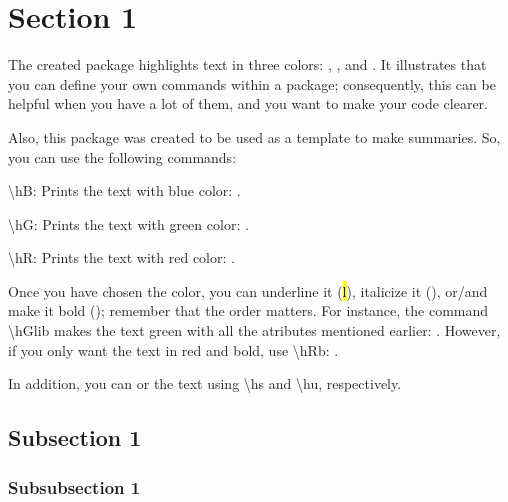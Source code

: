 
\section{Section 1}

  The created package highlights text in three colors: , , and .  It illustrates that you can define your own commands within a package; consequently, this can be helpful when you have a lot of them, and you want to make your code clearer.

  Also, this package was created to be used as a template to make summaries.  So, you can use the following commands:

  \begin{li}
    \item \textbackslash hB: Prints the text with blue  color: .
    \item \textbackslash hG: Prints the text with green color: .
    \item \textbackslash hR: Prints the text with red   color: .
  \end{li}

  Once you have chosen the color, you can underline it (\hl{l}), italicize it (), or/and make it bold (); remember that the order matters.  For instance, the command \textbackslash hGlib makes the text green with all the atributes mentioned earlier: .  However, if you only want the text in red and bold, use \textbackslash hRb: .

  In addition, you can  or  the text using \textbackslash hs and \textbackslash hu, respectively.

  \subsection{Subsection 1}

    \lipsum[1-6]

    \subsubsection{Subsubsection 1}

      \lipsum
      \lipsum[1-2]
      \pagebreak
